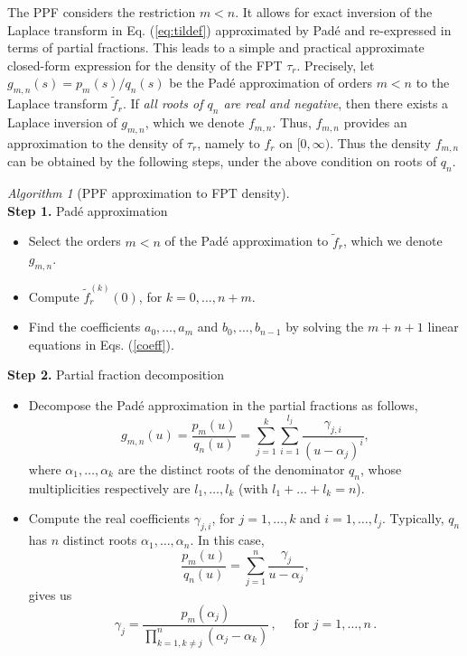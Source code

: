 \documentclass[preprint,12pt]{elsarticle}
\numberwithin{equation}{section}
\theoremstyle{plain} \newtheorem{theorem}{Theorem}[section]
\theoremstyle{plain} \newtheorem{proposition}[theorem]{Proposition}
\theoremstyle{plain} \newtheorem{lemma}[theorem]{Lemma}
\theoremstyle{plain} \newtheorem{corollary}[theorem]{Corollary}
\theoremstyle{definition} \newtheorem{definition}[theorem]{Definition}
\theoremstyle{definition} \newtheorem{notation}[theorem]{Notation}
\theoremstyle{remark} \newtheorem{remark}[theorem]{Remark}
\theoremstyle{remark} \newtheorem{remarks}[theorem]{Remarks}
\theoremstyle{remark} \newtheorem{algorithm2}[theorem]{Algorithm}
\theoremstyle{remark} \newtheorem{example}[theorem]{Example}
\begin{document}
The PPF considers the restriction $m<n$. It
allows for exact inversion of the Laplace transform in Eq. 
(\ref{eq:tildef})
approximated by Pad\'e and re-expressed in terms of partial 
fractions.
This leads to a simple and practical approximate 
closed-form expression for the 
density of the FPT $\tau_r$. Precisely,
let $g_{m,n}(s) =p_m(s)/q_n(s) $ be the 
Pad\'e approximation of orders $m<n$ to the Laplace transform $\tilde{f}_r$. If
{\it all roots of $q_n$ are real and negative}, then there exists a Laplace inversion of $g_{m,n}$, which we denote $f_{m,n}$. 
Thus, $f_{m,n}$ provides an approximation to the density of $\tau_r$, namely to $f_r$ on $[0, \infty)$.
Thus the density $f_{m,n}$ can be obtained by the following steps, under the
above condition on roots of $q_n$.
\begin{algorithm2}[PPF approximation to FPT density]
    \label{prop:Pade_approximant}
    $\;$ \\
\noindent \textbf{Step 1.} Pad\'e approximation
\begin{itemize}
\item
Select the orders $m<n$ of the Pad\'e approximation 
to $\tilde{f}_r$, which we denote $g_{m,n}$.
\item Compute $\tilde{f}_r^{(k)}(0)$, for $k = 0, \ldots , n+m$.
\item Find 
the coefficients $a_0, \ldots, a_m$ and $b_0,\ldots,b_{n-1}$
by solving the $m+n+1$ linear equations in Eqs.
(\ref{coeff}).
\end{itemize}
\noindent \textbf{Step 2.} Partial fraction decomposition
\begin{itemize}
\item
Decompose the Pad\'e approximation 
in the partial fractions as follows,
\begin{equation}
\label{eq:pfd}
g_{m,n}(u) = 
	 \frac{p_m(u)}{q_n(u)}=\sum_{j=1}^k \sum_{i=1}^{l_j} \frac{\gamma_{j,i}}{(u-\alpha_j)^i},
\end{equation}
where $\alpha_1, \ldots, \alpha_k$ are the distinct roots of the denominator $q_n$, whose multiplicities respectively are 
$l_1, \ldots, l_k$ (with $l_1 + \ldots + l_k = n$).
\item Compute the real coefficients $\gamma_{j,i}$, 
for $j = 1, \ldots, k$ 
and $i = 1, \ldots, l_j$.
Typically, $q_n$ has $n$ distinct roots $\alpha_1,\dots,\alpha_n$.
In this case,
\begin{equation*}
	 \frac{p_m(u)}{q_n(u)}=\sum_{j=1}^n \frac{\gamma_{j}}{u-\alpha_j},
\end{equation*}
gives us
\begin{equation*}
    \gamma_j=\frac{p_m(\alpha_j)}{\prod_{k=1, k\neq j}^n (\alpha_j-\alpha_k)}\,,\quad \text{ for } j=1,\dots, n\,. 
\end{equation*}


\end{itemize}
\end{algorithm2}
\end{document}
